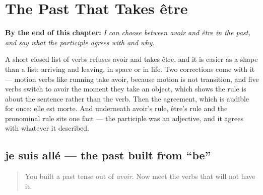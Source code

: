 
\chapter{The Past That Takes être}
\label{ch:passe-compose-etre}

\begin{chapteropening}
\textbf{By the end of this chapter:} \emph{I can choose between avoir and être in the past, and say what the participle agrees with and why.}

A short closed list of verbs refuses avoir and takes être, and it is easier as a shape than a list: arriving and leaving, in space or in life. Two corrections come with it — motion verbs like running take avoir, because motion is not transition, and five verbs switch to avoir the moment they take an object, which shows the rule is about the sentence rather than the verb. Then the agreement, which is audible for once: elle est morte. And underneath avoir's rule, être's rule and the pronominal rule sits one fact — the participle was an adjective, and it agrees with whatever it described.
\end{chapteropening}

\section[je suis allé]{je suis allé — the past built from \textquotedblleft{}be\textquotedblright{}}

\label{lesson:FR-C16-suis-alle}



\begin{quote}
You built a past tense out of \emph{avoir}. Now meet the verbs that will not have it.
\end{quote}

